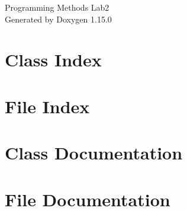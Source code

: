 \documentclass[twoside]{book}
\newcommand{\+}{\discretionary{\mbox{\scriptsize$\hookleftarrow$}}{}{}}
\newcommand{\clearemptydoublepage}{%
    \newpage{\pagestyle{empty}\cleardoublepage}%
  }
\begin{document}
  \raggedbottom
    \hypersetup{pageanchor=false,
                bookmarksnumbered=true,
                pdfencoding=unicode
               }
  \begin{titlepage}
  \vspace*{7cm}
  \begin{center}%
  {\Large Programming Methods Lab2}\\
  \vspace*{1cm}
  {\large Generated by Doxygen 1.15.0}\\
  \end{center}
  \end{titlepage}
  \clearemptydoublepage
  \tableofcontents
  \clearemptydoublepage
  \hypersetup{pageanchor=true}
\chapter{Class Index}

\chapter{File Index}

\chapter{Class Documentation}



\chapter{File Documentation}




  \backmatter
  \newpage
  \clearemptydoublepage
  \printindex
\end{document}
